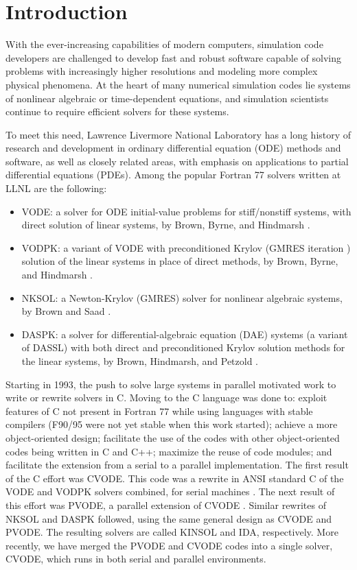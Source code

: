 \section{Introduction}

With the ever-increasing capabilities of modern computers, simulation
code developers are challenged to develop fast and robust software
capable of solving problems with increasingly higher resolutions and
modeling more complex
physical phenomena.  At the heart of many numerical simulation codes
lie systems of nonlinear algebraic or time-dependent equations, and
simulation scientists continue to require efficient solvers for these
systems.

To meet this need, Lawrence Livermore National Laboratory
has a long history of research and development in ordinary
differential equation (ODE) methods and software, as well as closely related
areas, with emphasis on applications to partial differential equations
(PDEs).  Among the popular Fortran 77 solvers written at LLNL are the
following:
\begin{itemize}
\item VODE: a solver for ODE initial-value problems for stiff/nonstiff
systems, with direct solution of linear systems, by Brown, Byrne, and
Hindmarsh \cite{BBH:89}.
\item VODPK: a variant of VODE with preconditioned Krylov (GMRES
iteration \cite{SaSc:86}) solution of the linear systems in place
of direct methods, by Brown, Byrne, and Hindmarsh \cite{Byr:92}.
\item NKSOL: a Newton-Krylov (GMRES) solver for nonlinear algebraic
systems, by Brown and Saad \cite{BrSa:90}.
\item DASPK: a solver for differential-algebraic equation (DAE)
systems (a variant of DASSL) with both direct and preconditioned
Krylov solution methods for the linear systems, by Brown, Hindmarsh,
and Petzold \cite{BHP:94}.
\end{itemize}
Starting in 1993, the push to solve large systems in parallel
motivated work to write or rewrite solvers in C. Moving to the C
language was done to: exploit features of C not present in Fortran
77 while using languages with stable compilers (F90/95 were not
yet stable when this work started); achieve a more object-oriented
design; facilitate the use of the codes with other object-oriented
codes being written in C and C++; maximize the reuse of code
modules; and facilitate the extension from a serial to a parallel
implementation. The first result of the C effort was CVODE. This
code was a rewrite in ANSI standard C of the VODE and VODPK
solvers combined, for serial machines \cite{CoHi:94,CoHi:96}.  The
next result of this effort was PVODE, a parallel extension of
CVODE \cite{ByHi:98,ByHi:99}. Similar rewrites of NKSOL and DASPK
followed, using the same general design as CVODE and PVODE.  The
resulting solvers are called KINSOL and IDA, respectively. More
recently, we have merged the PVODE and CVODE codes into a single
solver, CVODE, which runs in both serial and parallel
environments.

